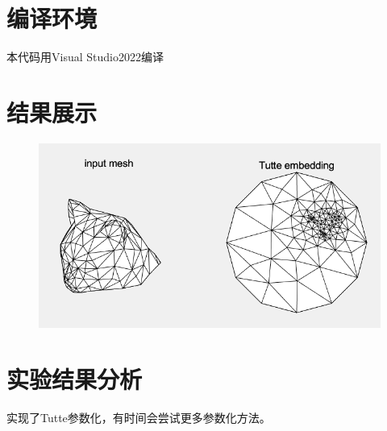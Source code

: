 \documentclass{article}
\begin{document}
	\section{编译环境}
	本代码用Visual Studio2022编译
	\section{结果展示}
	\begin{figure}[H]
		\centering
		\includegraphics[scale=0.9]{result}
		\caption{}
		\label{fig:result}
	\end{figure}
	\section{实验结果分析}
	实现了Tutte参数化，有时间会尝试更多参数化方法。
\end{document}
